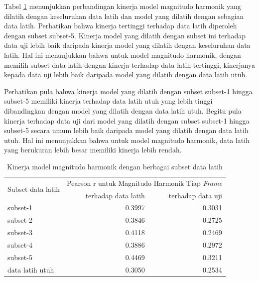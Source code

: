 Tabel \ref{tab-mag-model-subset-results} menunjukkan perbandingan kinerja model magnitudo harmonik yang dilatih dengan keseluruhan data latih dan model yang dilatih dengan sebagian data latih. Perhatikan bahwa kinerja tertinggi terhadap data latih diperoleh dengan subset subset-5. Kinerja model yang dilatih dengan subset ini terhadap data uji lebih baik daripada kinerja model yang dilatih dengan keseluruhan data latih. Hal ini menunjukkan bahwa untuk model magnitudo harmonik, dengan memilih subset data latih dengan kinerja terhadap data latih tertinggi, kinerjanya kepada data uji lebih baik daripada model yang dilatih dengan data latih utuh. 

Perhatikan pula bahwa kinerja model yang dilatih dengan subset subset-1 hingga subset-5 memiliki kinerja terhadap data latih utuh yang lebih tinggi dibandingkan dengan model yang dilatih dengan data latih utuh. Begitu pula kinerja terhadap data uji dari model yang dilatih dengan subset subset-1 hingga subset-5 secara umum lebih baik daripada model yang dilatih dengan data latih utuh. Hal ini menunjukkan bahwa untuk model magnitudo harmonik, data latih yang berukuran lebih besar memiliki kinerja lebih rendah.

\begin{table}[htbp]
    \centering
    \caption{Kinerja model magnitudo harmonik dengan berbagai subset data latih}\label{tab-mag-model-subset-results}
    \begin{tabular}{ |l|r|r| } 
     \hline
     \multirow{2}{*}{Subset data latih} & \multicolumn{2}{l|}{Pearson r untuk Magnitudo Harmonik Tiap \textit{Frame}} \\
     \cline{2-3}
     & terhadap data latih & terhadap data uji \\\hline
	subset-1      &0.3997  &0.3031\\\hline
	subset-2      &0.3846  &0.2725\\\hline
	subset-3      &0.4118  &0.2469\\\hline
	subset-4      &0.3886  &0.2972\\\hline
	subset-5      &0.4469  &0.3211\\\hline
	data latih utuh    	 &0.3050  &0.2534\\\hline
    \end{tabular}
\end{table}

